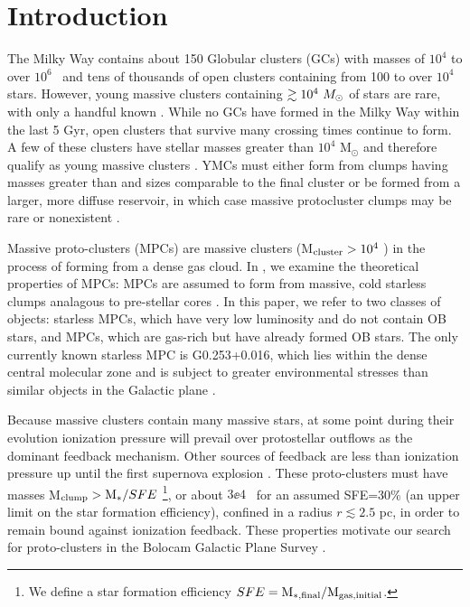 \section{Introduction}

The Milky Way contains about 150 Globular clusters (GCs) with masses of $10^4$
to over $10^6$ \msun\ and tens of thousands of open clusters containing from
100 to over $10^4$ stars.  However, young massive clusters containing
$\gtrsim10^4~M_{\odot}$ of stars are rare, with only a handful known
\citep{PortegiesZwart2010}. While no GCs have formed in the Milky Way within
the last 5 Gyr, open clusters that survive many crossing times continue to
form.   A few of these clusters have stellar masses greater than $10^4$
M$_{\odot}$ and therefore qualify as young massive clusters
\citep[YMCs;][]{PortegiesZwart2010}.   YMCs must either form from clumps having
masses greater than and sizes comparable to the final cluster  or be formed
from a larger, more diffuse reservoir, in which case massive protocluster
clumps may be rare or nonexistent  \citep{Kennicutt2012}.



Massive proto-clusters (MPCs) are massive clusters (M$_{\rm cluster}>10^4$ \msun)
in the process of forming from a dense gas cloud.  In \citet{Bressert2012}, we
examine the theoretical properties of MPCs: MPCs are assumed to form from
massive, cold starless clumps analagous to pre-stellar cores
\citep{Williams2000}.  In this paper, we refer to two classes of objects:
starless MPCs, which have very low luminosity and do not contain OB stars, and
MPCs, which are gas-rich but have already formed OB stars.  The only
currently known starless MPC is G0.253+0.016, which lies within the dense
central molecular zone and is subject to greater environmental stresses than
similar objects in the Galactic plane \citep{Longmore2012}.

Because massive clusters contain many massive stars, at some point during their
evolution ionization pressure will prevail over protostellar outflows as the
dominant feedback mechanism.  Other sources of feedback are less than
ionization pressure up until the first supernova explosion
\citep{Bressert2012}.  These proto-clusters must have masses
M$_{\rm clump}>{\rm M}_{*}/SFE$ \footnote{We define a star formation efficiency
$SFE={\rm M}_{\rm *,final} / {\rm M}_{\rm gas,initial}$.}, or about $3\ee{4}$ \msun\ for an assumed
SFE=30\% (an upper limit on the star formation efficiency),
confined in a radius $r\lesssim2.5$ pc, in order to remain bound against
ionization feedback.  These properties motivate our search for proto-clusters
in the Bolocam Galactic Plane Survey \citep[BGPS;][
\url{http://irsa.ipac.caltech.edu/data/BOLOCAM_GPS/}]{Aguirre2011}.


